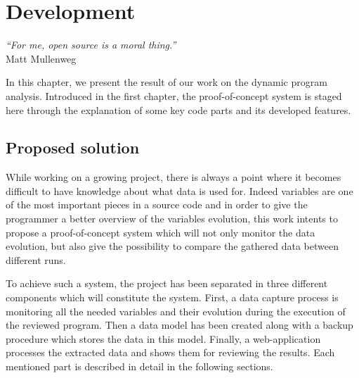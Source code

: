 

\chapter{Development} %
\label{chap:development}
\begin{flushright}
\textit{``For me, open source is a moral thing.''} \\ Matt Mullenweg
\end{flushright}

In this chapter, we present the result of our work on the dynamic program analysis. Introduced in the first chapter, the proof-of-concept system is staged here through the explanation of some key code parts and its developed features.

\section{Proposed solution}
While working on a growing project, there is always a point where it becomes difficult to have knowledge about what data is used for. Indeed variables are one of the most important pieces in a source code and in order to give the programmer a better overview of the variables evolution, this work intents to propose a proof-of-concept system which will not only monitor the data evolution, but also give the possibility to compare the gathered data between different runs.

To achieve such a system, the project has been separated in three different components which will constitute the system. First, a data capture process is monitoring all the needed variables and their evolution during the execution of the reviewed program. Then a data model has been created along with a backup procedure which stores the data in this model. Finally, a web-application processes the extracted data and shows them for reviewing the results. Each mentioned part is described in detail in the following sections.

